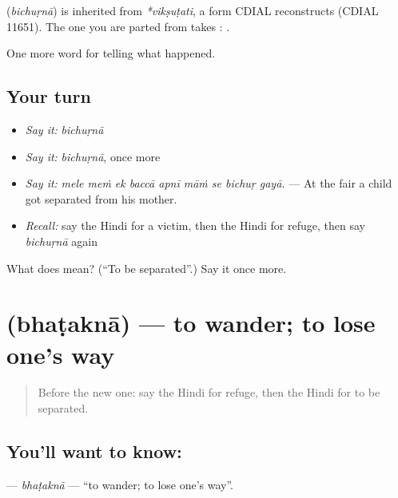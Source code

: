 \begin{cousinweb}
\textbf{} (\emph{bichuṛnā}) is inherited from \emph{*vikṣuṭati}, a form CDIAL reconstructs (CDIAL 11651). The one you are parted from takes \textbf{}: \textbf{   }.
\end{cousinweb}

\begin{grammarlens}[title={What you've built}]
One more word for telling what happened.
\end{grammarlens}

\subsection*{Your turn}
\begin{itemize}
\raggedright
  \item \emph{Say it:} \emph{bichuṛnā}
  \item \emph{Say it:} \emph{bichuṛnā}, once more
  \item \emph{Say it:} \emph{mele meṁ ek baccā apnī māṁ se bichuṛ gayā.} — At the fair a child got separated from his mother.
  \item \emph{Recall:} say the Hindi for a victim, then the Hindi for refuge, then say \emph{bichuṛnā} again
\end{itemize}

\begin{tcolorbox}[breakable,colback=teal!4,colframe=teal!35!black,title={Before you move on}]
What does  mean? (\textquotedblleft{}To be separated\textquotedblright{}.) Say it once more.
\end{tcolorbox}
\section[\texorpdfstring{\hi{भटकना} (bhaṭaknā)}{भटकना (bhaṭaknā)}]{ (bhaṭaknā) — to wander; to lose one's way}

\label{lesson:HI-C310-bhatakna}



\begin{quote}
Before the new one: say the Hindi for refuge, then the Hindi for to be separated.
\end{quote}

\subsection*{You'll want to know: }
\textbf{} — \emph{bhaṭaknā} — \textquotedblleft{}to wander; to lose one's way\textquotedblright{}.

